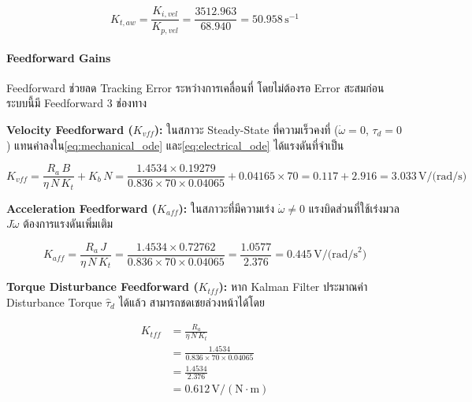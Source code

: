 \begin{equation}
    K_{t,aw} = \frac{K_{i,vel}}{K_{p,vel}}
             = \frac{3512.963}{68.940}
             = 50.958\,\text{s}^{-1}
    \label{eq:Ktaw}
\end{equation}

\paragraph{Feedforward Gains}

Feedforward ช่วยลด Tracking Error ระหว่างการเคลื่อนที่
โดยไม่ต้องรอ Error สะสมก่อน
ระบบนี้มี Feedforward 3 ช่องทาง

\textbf{Velocity Feedforward ($K_{vff}$):}
ในสภาวะ Steady-State ที่ความเร็วคงที่
($\dot{\omega} = 0$, $\tau_d = 0$)
แทนค่าลงใน\cref{eq:mechanical_ode} และ\cref{eq:electrical_ode}
ได้แรงดันที่จำเป็น

\begin{equation}
    K_{vff} = \frac{R_a\,B}{\eta\,N\,K_t} + K_b\,N
            = \frac{1.4534 \times 0.19279}{0.836 \times 70 \times 0.04065}
              + 0.04165 \times 70
            = 0.117 + 2.916
            = 3.033\,\text{V/(rad/s)}
    \label{eq:kvff}
\end{equation}

\textbf{Acceleration Feedforward ($K_{aff}$):}
ในสภาวะที่มีความเร่ง $\dot{\omega} \neq 0$
แรงบิดส่วนที่ใช้เร่งมวล $J\dot{\omega}$
ต้องการแรงดันเพิ่มเติม

\begin{equation}
    K_{aff} = \frac{R_a\,J}{\eta\,N\,K_t}
            = \frac{1.4534 \times 0.72762}{0.836 \times 70 \times 0.04065}
            = \frac{1.0577}{2.376}
            = 0.445\,\text{V/(rad/s}^2\text{)}
    \label{eq:kaff}
\end{equation}

\textbf{Torque Disturbance Feedforward ($K_{tff}$):}
หาก Kalman Filter ประมาณค่า Disturbance Torque $\hat{\tau}_d$
ได้แล้ว สามารถชดเชยล่วงหน้าได้โดย

\begin{equation}
    \begin{aligned}
        K_{tff} &= \frac{R_a}{\eta \, N \, K_t} \\
                &= \frac{1.4534}{0.836 \times 70 \times 0.04065} \\
                &= \frac{1.4534}{2.376} \\
                &= 0.612 \, \mathrm{V/(N \cdot m)}
    \end{aligned}
    \label{eq:ktff}
\end{equation}

